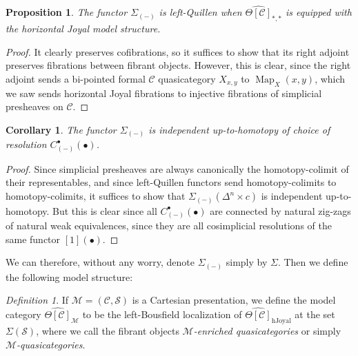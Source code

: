 \documentclass[leqno]{article}
\numberwithin{equation}{subsection}
\theoremstyle{plain}   %
\newtheorem{prop}[equation]{Proposition}
\newtheorem{cor}[equation]{Corollary}
\theoremstyle{remark}
\newtheorem{defn}[equation]{Definition}
\theoremstyle{plain}
\DeclareMathOperator{\Map}{Map}
\providecommand{\C}{}
\renewcommand{\C}{\ensuremath{\mathcal{C}}}
\newcommand{\M}{\ensuremath{\mathcal{M}}}
\newcommand{\setS}{\ensuremath{\mathscr{S}}}
\newcommand{\cellset}{\ensuremath{\widehat{\Theta[\mathcal{C}]}}}
\begin{document}
\begin{prop} The functor \(\Sigma_{(-)}\) is left-Quillen when \(\cellset_{\ast,\ast}\) is equipped with the horizontal Joyal model structure.
\end{prop}
\begin{proof} 
  It clearly preserves cofibrations, so it suffices to show that its right adjoint preserves fibrations between fibrant objects.  However, this is clear, since the right adjoint sends a bi-pointed formal \(\C\) quasicategory \(X_{x,y}\) to \(\Map_X(x,y)\), which we saw sends horizontal Joyal fibrations to injective fibrations of simplicial presheaves on \(\C\).
\end{proof}
\begin{cor}
  The functor \(\Sigma_{(-)}\) is independent up-to-homotopy of choice of resolution \(C_{(-)}^\bullet(\bullet)\).
\end{cor}
\begin{proof}
  Since simplicial presheaves are always canonically the homotopy-colimit of their representables, and since left-Quillen functors send homotopy-colimits to homotopy-colimits, it suffices to show that \(\Sigma_{(-)}(\Delta^n\times c)\) is independent up-to-homotopy.  But this is clear since all \(C_{(-)}^\bullet(\bullet)\) are connected by natural zig-zags of natural weak equivalences, since they are all cosimplicial resolutions of the same functor \([1](\bullet)\).
\end{proof}
We can therefore, without any worry, denote \(\Sigma_{(-)}\) simply by \(\Sigma\).  Then we define the following model structure:
\begin{defn}
  If \(\M=(\C,\setS)\) is a Cartesian presentation, we define the model category \(\cellset_{\M}\) to be the left-Bousfield localization of \(\cellset_\mathrm{hJoyal}\) at the set \(\Sigma(\setS)\), where we call the fibrant objects \emph{\(\M\)-enriched quasicategories} or simply \emph{\(\M\)-quasicategories}.
\end{defn}
\end{document}
